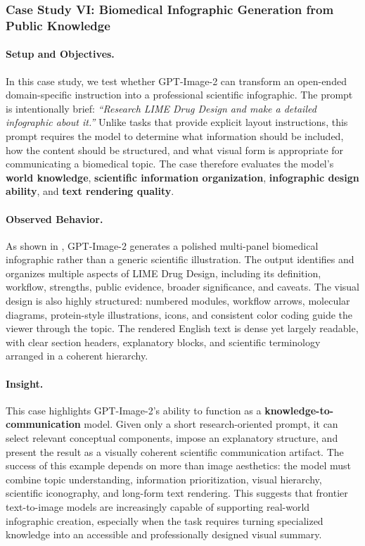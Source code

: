 \subsubsection{Case Study VI: Biomedical Infographic Generation from Public Knowledge}

\paragraph{Setup and Objectives.}
In this case study, we test whether GPT-Image-2 can transform an open-ended domain-specific instruction into a professional scientific infographic. The prompt is intentionally brief: \emph{``Research LIME Drug Design and make a detailed infographic about it.''} Unlike tasks that provide explicit layout instructions, this prompt requires the model to determine what information should be included, how the content should be structured, and what visual form is appropriate for communicating a biomedical topic. The case therefore evaluates the model's \textbf{world knowledge}, \textbf{scientific information organization}, \textbf{infographic design ability}, and \textbf{text rendering quality}.

\paragraph{Observed Behavior.}
As shown in , GPT-Image-2 generates a polished multi-panel biomedical infographic rather than a generic scientific illustration. The output identifies and organizes multiple aspects of LIME Drug Design, including its definition, workflow, strengths, public evidence, broader significance, and caveats. The visual design is also highly structured: numbered modules, workflow arrows, molecular diagrams, protein-style illustrations, icons, and consistent color coding guide the viewer through the topic. The rendered English text is dense yet largely readable, with clear section headers, explanatory blocks, and scientific terminology arranged in a coherent hierarchy.

\paragraph{Insight.}
This case highlights GPT-Image-2's ability to function as a \textbf{knowledge-to-communication} model. Given only a short research-oriented prompt, it can select relevant conceptual components, impose an explanatory structure, and present the result as a visually coherent scientific communication artifact. The success of this example depends on more than image aesthetics: the model must combine topic understanding, information prioritization, visual hierarchy, scientific iconography, and long-form text rendering. This suggests that frontier text-to-image models are increasingly capable of supporting real-world infographic creation, especially when the task requires turning specialized knowledge into an accessible and professionally designed visual summary.


